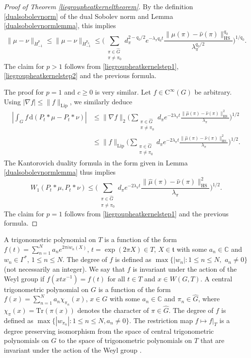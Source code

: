 \documentclass[11pt,a4paper]{article}
\theoremstyle{definition}
\begin{document}
\begin{proof}[Proof of Theorem \ref{liegroupheatkerneltheorem}]
By the definition \eqref{dualsobolevnorm} of the dual Sobolev norm and Lemma \ref{dualsobolevnormlemma}, this implies
\[ \| \mu - \nu \|_{\dot{H}_{-1}^p} \le \| \mu - \nu \|_{\dot{H}_{-1}^{p_0}} \le \Bigg( \sum_{\substack{\pi \in \widehat{G} \\ \pi \neq \pi_0}} d_{\pi}^{2-q_0/2} e^{-\lambda_{\pi} q_0 t} \frac{\| \widehat{\mu}(\pi) - \widehat{\nu}(\pi) \|_{\mathrm{HS}}^{q_0}}{\lambda_{\pi}^{q_0/2}} \Bigg)^{1/q_0} . \]
The claim for $p>1$ follows from \eqref{liegroupheatkernelstep1}, \eqref{liegroupheatkernelstep2} and the previous formula.

The proof for $p=1$ and $c \ge 0$ is very similar. Let $f \in \mathrm{C}^{\infty}(G)$ be arbitrary. Using $|\nabla f| \le \| f \|_{\mathrm{Lip}}$, we similarly deduce
\[ \begin{split} \left| \int_G f \, \mathrm{d} (P_t * \mu - P_t * \nu) \right| &\le \| \nabla f \|_2 \Bigg( \sum_{\substack{\pi \in \widehat{G} \\ \pi \neq \pi_0}} d_{\pi} e^{-2 \lambda_{\pi} t} \frac{\| \widehat{\mu}(\pi) - \widehat{\nu}(\pi) \|_{\mathrm{HS}}^2}{\lambda_{\pi}} \Bigg)^{1/2} \\ &\le \| f \|_{\mathrm{Lip}} \Bigg( \sum_{\substack{\pi \in \widehat{G} \\ \pi \neq \pi_0}} d_{\pi} e^{-2 \lambda_{\pi} t} \frac{\| \widehat{\mu}(\pi) - \widehat{\nu}(\pi) \|_{\mathrm{HS}}^2}{\lambda_{\pi}} \Bigg)^{1/2} . \end{split} \]
The Kantorovich duality formula in the form given in Lemma \ref{dualsobolevnormlemma} thus implies
\[ W_1 (P_t * \mu, P_t * \nu) \le \Bigg( \sum_{\substack{\pi \in \widehat{G} \\ \pi \neq \pi_0}} d_{\pi} e^{-2 \lambda_{\pi} t} \frac{\| \widehat{\mu}(\pi) - \widehat{\nu}(\pi) \|_{\mathrm{HS}}^2}{\lambda_{\pi}} \Bigg)^{1/2} . \]
The claim for $p=1$ follows from \eqref{liegroupheatkernelstep1} and the previous formula.
\end{proof}

A trigonometric polynomial on $T$ is a function of the form $f(t)=\sum_{n=1}^N a_n e^{2 \pi i w_n (X)}$, $t=\exp (2 \pi X) \in T$, $X \in \mathfrak{t}$ with some $a_n \in \mathbb{C}$ and $w_n \in \Gamma^*$, $1 \le n \le N$. The degree of $f$ is defined as $\max\{ |w_n| : 1 \le n \le N, \,\, a_n \neq 0 \}$ (not necessarily an integer). We say that $f$ is invariant under the action of the Weyl group if $f(xtx^{-1})=f(t)$ for all $t \in T$ and $x \in W(G,T)$. A central trigonometric polynomial on $G$ is a function of the form $f(x)=\sum_{n=1}^N a_n \chi_{\pi_n}(x)$, $x \in G$ with some $a_n \in \mathbb{C}$ and $\pi_n \in \widehat{G}$, where $\chi_{\pi}(x) = \mathrm{Tr}(\pi(x))$ denotes the character of $\pi \in \widehat{G}$. The degree of $f$ is defined as $\max \{ |w_{\pi_n}| : 1 \le n \le N, a_n \neq 0 \}$. The restriction map $f \mapsto f|_T$ is a degree preserving isomorphism from the space of central trigonometric polynomials on $G$ to the space of trigonometric polynomials on $T$ that are invariant under the action of the Weyl group \cite[Lemma 1]{CK}.
\end{document}
